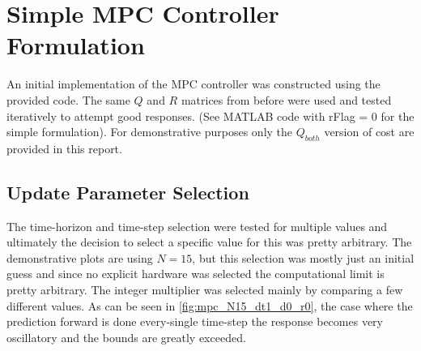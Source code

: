 \documentclass[]{IEEEtran}
\begin{document}
\section{Simple MPC Controller Formulation}
An initial implementation of the MPC controller was constructed using the provided code.
The same $Q$ and $R$ matrices from before were used and tested iteratively to attempt good responses.
(See MATLAB code with rFlag = 0 for the simple formulation).
For demonstrative purposes only the $Q_{both}$ version of cost are provided in this report.

\subsection{Update Parameter Selection}
The time-horizon and time-step selection were tested for multiple values and ultimately the decision to select a specific value for this was pretty arbitrary.
The demonstrative plots are using $N=15$, but this selection was mostly just an initial guess and since no explicit hardware was selected the computational limit is pretty arbitrary.
The integer multiplier was selected mainly by comparing a few different values.
As can be seen in \autoref{fig:mpc_N15_dt1_d0_r0}, the case where the prediction forward is done every-single time-step the response becomes very oscillatory and the bounds are greatly exceeded.
\end{document}
